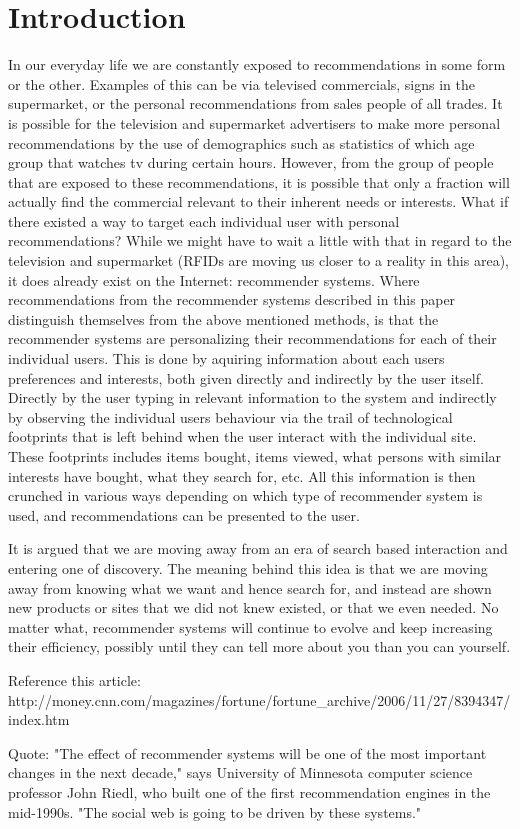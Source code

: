 \section{Introduction}


In our everyday life we are constantly exposed to recommendations in some form or the other. Examples of this can be via televised commercials, signs in the supermarket, or the personal recommendations from sales people of all trades.
It is possible for the television and supermarket advertisers to make more personal recommendations by the use of demographics such as statistics of which age group that watches tv during certain hours. However, from the group of people that are exposed to these recommendations, it is possible that only a fraction will actually find the commercial relevant to their inherent needs or interests. What if there existed a way to target each individual user with personal recommendations? While we might have to wait a little with that in regard to the television and supermarket (RFIDs are moving us closer to a reality in this area), it does already exist on the Internet: recommender systems.
Where recommendations from the recommender systems described in this paper distinguish themselves from the above mentioned methods, is that the recommender systems are personalizing their recommendations for each of their individual users. This is done by aquiring information about each users preferences and interests, both given directly and indirectly by the user itself. Directly by the user typing in relevant information to the system and indirectly by observing the individual users behaviour via the trail of technological footprints that is left behind when the user interact with the individual site. These footprints includes items bought, items viewed, what persons with similar interests have bought, what they search for, etc. All this information is then crunched in various ways depending on which type of recommender system is used, and recommendations can be presented to the user.

It is argued that we are moving away from an era of search based interaction and entering one of discovery. The meaning  behind this idea is that we are moving away from knowing what we want and hence search for, and instead are shown new products or sites that we did not knew existed, or that we even needed. No matter what, recommender systems will continue to evolve and keep increasing their efficiency, possibly until they can tell more about you than you can yourself.


Reference this article: http://money.cnn.com/magazines/fortune/fortune_archive/2006/11/27/8394347/index.htm

Quote:
"The effect of recommender systems will be one of the most important changes in the next decade," says University of Minnesota computer science professor John Riedl, who built one of the first recommendation engines in the mid-1990s. "The social web is going to be driven by these systems."